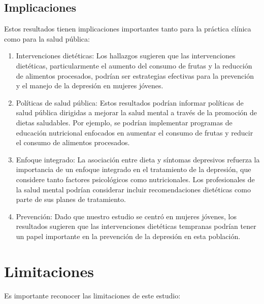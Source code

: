 \documentclass[jou]{apa7}
\begin{document}
	\subsection{Implicaciones}\label{implicaciones}
	
	Estos resultados tienen implicaciones importantes tanto para la práctica
	clínica como para la salud pública:
	
	\begin{enumerate}
		\item Intervenciones dietéticas: Los hallazgos sugieren que las intervenciones dietéticas, particularmente el aumento del consumo de frutas y la reducción de alimentos procesados, podrían ser estrategias efectivas para la prevención y el manejo de la depresión en mujeres jóvenes.
		\item Políticas de salud pública: Estos resultados podrían informar políticas de salud pública dirigidas a mejorar la salud mental a través de la promoción de dietas saludables. Por ejemplo, se podrían implementar programas de educación nutricional enfocados en aumentar el consumo de frutas y reducir el consumo de alimentos procesados.
		\item Enfoque integrado: La asociación entre dieta y síntomas depresivos refuerza la importancia de un enfoque integrado en el tratamiento de la depresión, que considere tanto factores psicológicos como nutricionales. Los profesionales de la salud mental podrían considerar incluir recomendaciones dietéticas como parte de sus planes de tratamiento.
		\item Prevención: Dado que nuestro estudio se centró en mujeres jóvenes, los resultados sugieren que las intervenciones dietéticas tempranas podrían tener un papel importante en la prevención de la depresión en esta población.
	\end{enumerate}
	
	
	\section{Limitaciones}\label{limitaciones}
	
	Es importante reconocer las limitaciones de este estudio:
	
\end{document}
